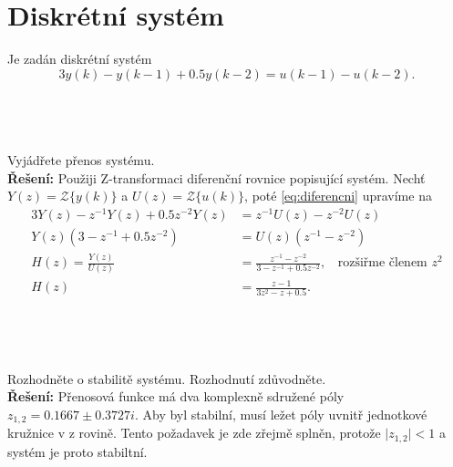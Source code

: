 \documentclass[twoside]{article}
\begin{document}
\section{Diskrétní systém}
\label{sec:ukol10}
Je zadán diskrétní systém
\begin{equation}
	\label{eq:diferencni}
	3y(k) - y(k-1) + 0.5 y(k-2) = u(k-1)-u(k-2).
\end{equation}

\subsection{~}
Vyjádřete přenos systému. \\
\textbf{Řešení:} Použiji Z-transformaci diferenční rovnice popisující systém. Nechť $Y(z) = \mathcal{Z}\{y(k)\}$ a $U(z) = \mathcal{Z}\{u(k)\}$, poté \eqref{eq:diferencni} upravíme na
\begin{equation}
	\begin{split}
		3Y(z) - z^{-1} Y(z) + 0.5 z^{-2} Y(z) &= z^{-1}U(z) - z^{-2}U(z) \\
		Y(z) (3- z^{-1} + 0.5 z^{-2}) &= U(z) (z^{-1} - z^{-2}) \\
		H(z) = \frac{Y(z)}{U(z)} &= \frac{z^{-1} - z^{-2}}{3-z^{-1}+ 0.5z^{-2}}, ~~~~\text{rozšiřme členem $z^2$} \\
		H(z) &= \frac{z - 1}{3z^2-z+ 0.5}.
	\end{split}
\end{equation}

\subsection{~}
Rozhodněte o stabilitě systému. Rozhodnutí zdůvodněte. \\
\textbf{Řešení:} Přenosová funkce má dva komplexně sdružené póly $ z_{1,2} = 0.1667 \pm 0.3727i$. Aby byl stabilní, musí ležet póly uvnitř jednotkové kružnice v z rovině.
Tento požadavek je zde zřejmě splněn, protože $\vert z_{1,2} \vert < 1 $ a systém je proto stabiltní.
\end{document}
